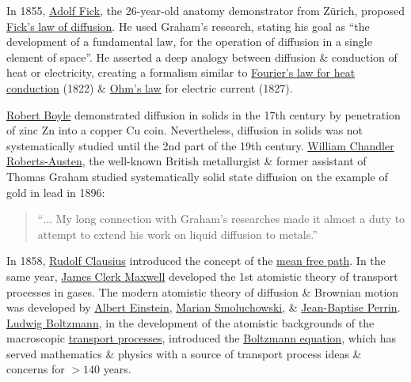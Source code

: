 \documentclass{article}
\begin{document}
In 1855, \href{https://en.wikipedia.org/wiki/Adolf_Fick}{\sc Adolf Fick}, the 26-year-old anatomy demonstrator from Z\"urich, proposed \href{https://en.wikipedia.org/wiki/Fick%27s_laws_of_diffusion}{Fick's law of diffusion}. He used Graham's research, stating his goal as ``the development of a fundamental law, for the operation of diffusion in a single element of space''. He asserted a deep analogy between diffusion \& conduction of heat or electricity, creating a formalism similar to \href{https://en.wikipedia.org/wiki/Thermal_conduction}{Fourier's law for heat conduction} (1822) \& \href{https://en.wikipedia.org/wiki/Ohm%27s_law}{Ohm's law} for electric current (1827).

\href{https://en.wikipedia.org/wiki/Robert_Boyle}{\sc Robert Boyle} demonstrated diffusion in solids in the 17th century by penetration of zinc Zn into a copper Cu coin. Nevertheless, diffusion in solids was not systematically studied until the 2nd part of the 19th century. \href{https://en.wikipedia.org/wiki/William_Chandler_Roberts-Austen}{\sc William Chandler Roberts-Austen}, the well-known British metallurgist \& former assistant of {\sc Thomas Graham} studied systematically solid state diffusion on the example of gold in lead in 1896:
\begin{quote}
	``$\ldots$ My long connection with Graham's researches made it almost a duty to attempt to extend his work on liquid diffusion to metals.''
\end{quote}
In 1858, \href{https://en.wikipedia.org/wiki/Rudolf_Clausius}{Rudolf Clausius} introduced the concept of the \href{https://en.wikipedia.org/wiki/Mean_free_path}{mean free path}. In the same year, \href{https://en.wikipedia.org/wiki/James_Clerk_Maxwell}{\sc James Clerk Maxwell} developed the 1st atomistic theory of transport processes in gases. The modern atomistic theory of diffusion \& Brownian motion was developed by \href{https://en.wikipedia.org/wiki/Albert_Einstein}{\sc Albert Einstein}, \href{https://en.wikipedia.org/wiki/Marian_Smoluchowski}{Marian Smoluchowski}, \& \href{https://en.wikipedia.org/wiki/Jean-Baptiste_Perrin}{Jean-Baptise Perrin}. \href{https://en.wikipedia.org/wiki/Ludwig_Boltzmann}{\sc Ludwig Boltzmann}, in the development of the atomistic backgrounds of the macroscopic \href{https://en.wikipedia.org/wiki/Transport_phenomena}{transport processes}, introduced the \href{https://en.wikipedia.org/wiki/Boltzmann_equation}{Boltzmann equation}, which has served mathematics \& physics with a source of transport process ideas \& concerns for $> 140$ years.
\end{document}
